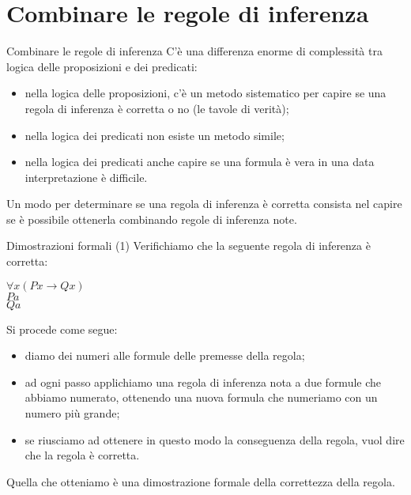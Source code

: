 \documentclass[aspectratio=169,10pt,dvipsnames,xcolor=table,handout]{beamer}
\begin{document}
\section{Combinare le regole di inferenza}

\begin{frame}{Combinare le regole di inferenza}
    C'è una differenza enorme di complessità tra logica delle proposizioni e dei predicati:
    \begin{itemize}
        \item nella logica delle proposizioni, c'è un metodo sistematico per capire se una regola di inferenza è corretta o no (le tavole di verità);
        \item nella logica dei predicati non esiste un metodo simile;
        \item nella logica dei predicati anche capire se una formula è vera in una data interpretazione è difficile.
    \end{itemize}

    \medskip
    Un modo per determinare se una regola di inferenza è corretta consista nel capire se è possibile ottenerla \alert{combinando regole di inferenza note}.
\end{frame}

\begin{frame}{Dimostrazioni formali (1)}
    Verifichiamo che la seguente regola di inferenza è corretta:
    \begin{center}
        \begin{inference}
            $\forall x (Px \to Qx)$\\
            $Pa$\\
            \hline
            $Qa$
        \end{inference}
    \end{center}
    Si procede come segue:
    \begin{itemize}
        \item diamo dei numeri alle formule delle premesse della regola;
        \item ad ogni passo applichiamo una regola di inferenza nota a due formule che abbiamo numerato, ottenendo una nuova formula che numeriamo con un numero più grande;
        \item se riusciamo ad ottenere in questo modo la conseguenza della regola, vuol dire che la regola è corretta.
    \end{itemize}
    Quella che otteniamo è una \alert{dimostrazione formale} della correttezza della regola.
\end{frame}
\end{document}
